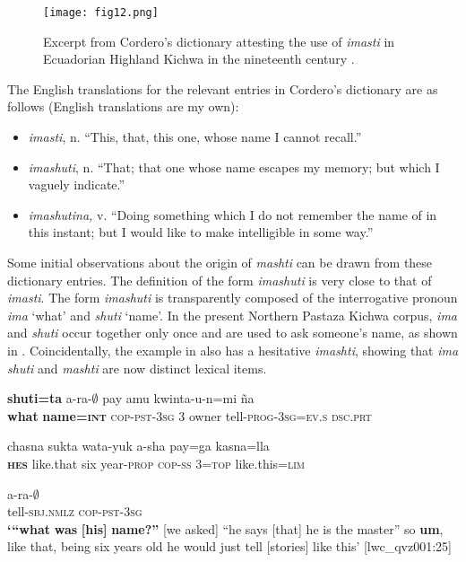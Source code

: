 \documentclass[output=paper]{langscibook}
\begin{document}
  
\begin{figure}
\texttt{[image: fig12.png]}
\caption{\label{fig:rice:12}Excerpt from Cordero's dictionary attesting the use of \textit{imasti} in Ecuadorian Highland Kichwa in the nineteenth century \citep[40]{Cordero1892}.}
\end{figure}

The English translations for the relevant entries in Cordero’s dictionary are as follows (English translations are my own):

\begin{itemize}
\item \textit{imasti}, n. “This, that, this one, whose name I cannot recall.”
\item \textit{imashuti}, n. “That; that one whose name escapes my memory; but which I vaguely indicate.”
\item \textit{imashutina,} v. “Doing something which I do not remember the name of in this instant; but I would like to make intelligible in some way.”
\end{itemize}

Some initial observations about the origin of \textit{mashti} can be drawn from these dictionary entries. The definition of the form \textit{imashuti} is very close to that of \textit{imasti}. The form \textit{imashuti} is transparently composed of the interrogative pronoun \textit{ima} ‘what’ and \textit{shuti} ‘name’. In the present Northern Pastaza Kichwa corpus, \textit{ima} and \textit{shuti} occur together only once and are used to ask someone’s name, as shown in . Coincidentally, the example in  also has a hesitative \textit{imashti}, showing that \textit{ima shuti} and \textit{mashti} are now distinct lexical items.

\ea%
\label{ex:rice:30bis}
 {\textbf{shuti=ta}} {a-ra-${\emptyset}$} {pay} {amu}  {kwinta-u-n=mi}  {ña}  \\
{\textbf{what}} {\textbf{name=\textsc{int}}} {\textsc{cop-pst-3sg}} {3} {owner} {tell-\textsc{prog-3sg=ev.s}} {\textsc{dsc.prt}}\\
\medskip

 {chasna} {sukta} {wata-yuk} {a-sha} {pay=ga} {kasna=lla} \\
{\textbf{\textsc{hes}}} {like.that} {six} {year-\textsc{prop}} {\textsc{cop-ss}} {3=\textsc{top}}    {like.this=\textsc{lim}}\\
\medskip

 {a-ra-${\emptyset}$}\\
{tell-\textsc{sbj.nmlz}}  {\textsc{cop-pst-3sg}}\\
\glt \textbf{‘“what} \textbf{was} \textbf{[his]} \textbf{name?”} [we asked] “he says [that] he is the master” so \textbf{um}, like that, being six years old he would just tell [stories] like this’ [lwc\_qvz001:25]
\z
\end{document}
